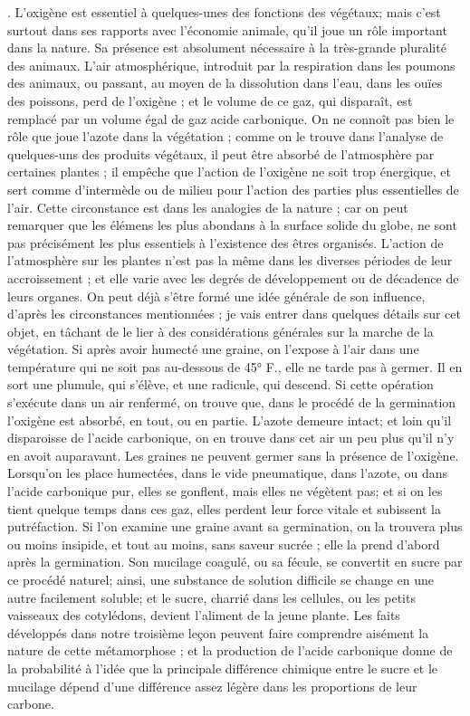 . L'oxigène est essentiel à quelques-unes des fonctions des végétaux; mais c'est surtout dans ses rapports avec l'économie animale, qu'il joue un rôle important dans la nature. Sa présence est absolument nécessaire à la très-grande pluralité des animaux. L'air atmosphérique, introduit par la respiration dans les poumons des animaux, ou passant, au moyen de la dissolution dans l'eau, dans les ouïes des poissons, perd de\setcounter{page}{12} l’oxigène ; et le volume de ce gaz, qui disparaît, est remplacé par un volume égal de gaz acide carbonique.
On ne connoît pas bien le rôle que joue l’azote dans la végétation ; comme on le trouve dans l’analyse de quelques-uns des produits végétaux, il peut être absorbé de l’atmosphère par certaines plantes ; il empêche que l’action de l’oxigène ne soit trop énergique, et sert comme d’intermède ou de milieu pour l’action des parties plus essentielles de l’air. Cette circonstance est dans les analogies de la nature ; car on peut remarquer que les élémens les plus abondans à la surface solide du globe, ne sont pas précisément les plus essentiels à l’existence des êtres organisés.
L’action de l’atmosphère sur les plantes n’est pas la même dans les diverses périodes de leur accroissement ; et elle varie avec les degrés de développement ou de décadence de leurs organes. On peut déjà s’être formé une idée générale de son influence, d’après les circonstances mentionnées ; je vais entrer dans quelques détails sur cet objet, en tâchant de le lier à des considérations générales sur la marche de la végétation.
Si après avoir humecté une graine, on l’expose à l’air dans une température qui\setcounter{page}{13} ne soit pas au-dessous de 45° F., elle ne tarde pas à germer. Il en sort une plumule, qui s'élève, et une radicule, qui descend.
Si cette opération s'exécute dans un air renfermé, on trouve que, dans le procédé de la germination l'oxigène est absorbé, en tout, ou en partie. L'azote demeure intact; et loin qu'il disparoisse de l'acide carbonique, on en trouve dans cet air un peu plus qu'il n'y en avoit auparavant.
Les graines ne peuvent germer sans la présence de l'oxigène. Lorsqu'on les place humectées, dans le vide pneumatique, dans l'azote, ou dans l'acide carbonique pur, elles se gonflent, mais elles ne végètent pas; et si on les tient quelque temps dans ces gaz, elles perdent leur force vitale et subissent la putréfaction.
Si l'on examine une graine avant sa germination, on la trouvera plus ou moins insipide, et tout au moins, sans saveur sucrée ; elle la prend d'abord après la germination. Son mucilage coagulé, ou sa fécule, se convertit en sucre par ce procédé naturel; ainsi, une substance de solution difficile se change en une autre facilement soluble; et le sucre, charrié dans les cellules, ou les petits vaisseaux des cotylédons, devient l'aliment de la jeune plante. Les faits\setcounter{page}{14} développés dans notre troisième leçon peuvent faire comprendre aisément la nature de cette métamorphose ; et la production de l'acide carbonique donne de la probabilité à l'idée que la principale différence chimique entre le sucre et le mucilage dépend d'une différence assez légère dans les proportions de leur carbone.
